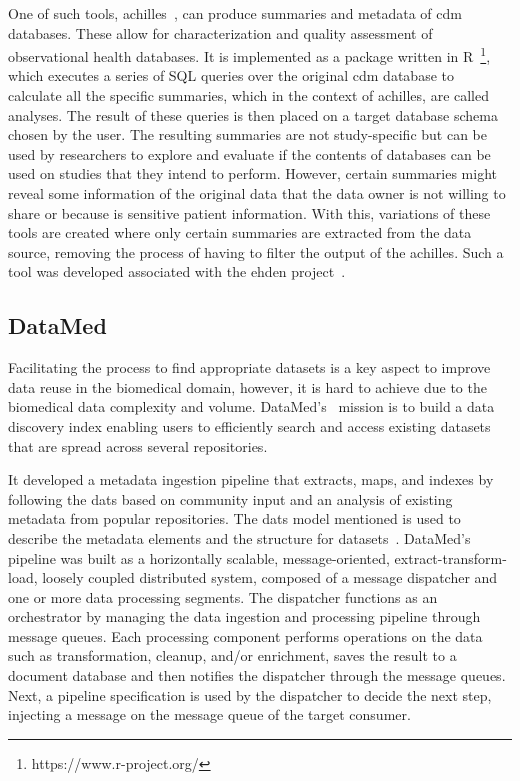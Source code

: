 One of such tools, \gls{achilles}~\cite{achilles-github}, can produce summaries and metadata of \gls{cdm} databases.
These allow for characterization and quality assessment of observational health databases.
It is implemented as a package written in R~\footnote{https://www.r-project.org/}, which executes a series of SQL queries over the original \gls{cdm} database to calculate all the specific summaries, which in the context of \gls{achilles}, are called analyses.
The result of these queries is then placed on a target database schema chosen by the user.
The resulting summaries are not study-specific but can be used by researchers to explore and evaluate if the contents of databases can be used on studies that they intend to perform.
However, certain summaries might reveal some information of the original data that the data owner is not willing to share or because is sensitive patient information.
With this, variations of these tools are created where only certain summaries are extracted from the data source, removing the process of having to filter the output of the \gls{achilles}.
Such a tool was developed associated with the \gls{ehden} project~\cite{peters-tool}.

\subsection*{DataMed}
Facilitating the process to find appropriate datasets is a key aspect to improve data reuse in the biomedical domain, however, it is hard to achieve due to the biomedical data complexity and volume.
DataMed's~\cite{datamed} mission is to build a data discovery index enabling users to efficiently search and access existing datasets that are spread across several repositories.

It developed a metadata ingestion pipeline that extracts, maps, and indexes by following the \gls{dats} based on community input and an analysis of existing metadata from popular repositories.
The \gls{dats} model mentioned is used to describe the metadata elements and the structure for datasets~\cite{dats}.
DataMed's pipeline was built as a horizontally scalable, message-oriented, extract-transform-load, loosely coupled distributed system, composed of a message dispatcher and one or more data processing segments.
The dispatcher functions as an orchestrator by managing the data ingestion and processing pipeline through message queues.
Each processing component performs operations on the data such as transformation, cleanup, and/or enrichment, saves the result to a document database and then notifies the dispatcher through the message queues.
Next, a pipeline specification is used by the dispatcher to decide the next step, injecting a message on the message queue of the target consumer.


